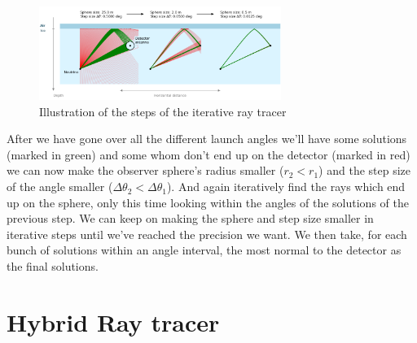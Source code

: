 \documentclass[11pt,a4paper,faculty=we,language=en,doctype=report]{cls/ugent-doc}
\begin{document}
\begin{figure}
  \centering
  \includegraphics[width=0.7\textwidth]{IterativeWorkings.png}
  \caption{Illustration of the steps of the iterative ray tracer}
  \label{fig:IterativeWorkings}
\end{figure}
After we have gone over all the different launch angles we'll have some
solutions (marked in green) and some whom don't end up on the detector (marked
in red) we can now make the observer sphere's radius smaller ($r_2 < r_1$) and
the step size of the angle smaller ($\Delta \theta_2 < \Delta \theta_1$).  And
again iteratively find the rays which end up on the sphere, only this time
looking within the angles of the solutions of the previous step. We can keep on
making the sphere and step size smaller in iterative steps until we've reached
the precision we want. We then take, for each bunch of solutions within an
angle interval, the most normal to the detector as the final solutions.


\chapter{Hybrid Ray tracer}
\label{chapter:hybrid}
\end{document}
